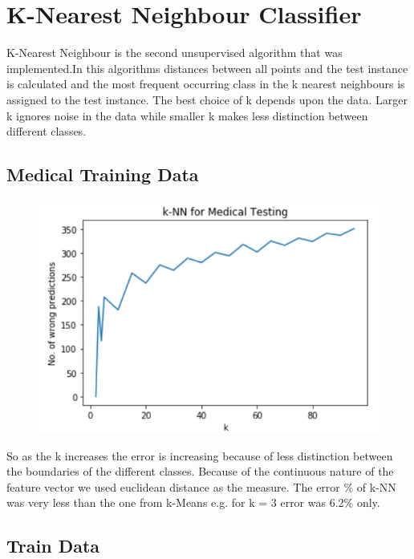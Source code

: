 \documentclass[conference]{IEEEtran}
\begin{document}
\section{\textbf{K-Nearest Neighbour Classifier}}
K-Nearest Neighbour is the second unsupervised algorithm that was implemented.In this algorithms distances between all points and the test instance is calculated and the most frequent occurring class in the k nearest neighbours is assigned to the test instance. The best choice of k depends upon the data. Larger k ignores noise in the data while smaller k makes less distinction between different classes.
\subsection{Medical Training Data}
\begin{figure}[htbp]
\centerline{\includegraphics{knnmedical.PNG}}
\label{fig}
\end{figure}
So as the k increases the error is increasing because of less distinction between the boundaries of the different classes. Because of the continuous nature of the feature vector we used euclidean distance as the measure. The error \% of k-NN was very less than the one from k-Means e.g. for k = 3 error was 6.2\% only. 
\subsection{Train Data}
\end{document}
